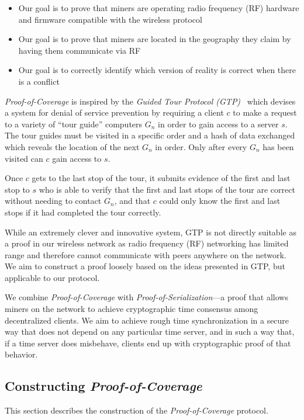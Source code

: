 \documentclass[UTF8, 10pt, nonatbib, nocopyrightspace, reprint]{sigplanconf}
\begin{document}
\begin{itemize}
    \item Our goal is to prove that miners are operating radio frequency (RF) hardware and firmware compatible with the wireless protocol
    \item Our goal is to prove that miners are located in the geography they claim by having them communicate via RF
    \item Our goal is to correctly identify which version of reality is correct when there is a conflict
\end{itemize}

\emph{Proof-of-Coverage} is inspired by the \emph{Guided Tour Protocol (GTP)}~\cite{gtp} which devises a system for denial of service prevention by requiring a client $c$ to make a request to a variety of ``tour guide'' computers $G_n$ in order to gain access to a server $s$. The tour guides must be visited in a specific order and a hash of data exchanged which reveals the location of the next $G_n$ in order. Only after every $G_n$ has been visited can $c$ gain access to $s$.

Once $c$ gets to the last stop of the tour, it submits evidence of the first and last stop to $s$ who is able to verify that the first and last stops of the tour are correct without needing to contact $G_n$, and that $c$ could only know the first and last stops if it had completed the tour correctly.

While an extremely clever and innovative system, GTP is not directly suitable as a proof in our wireless network as radio frequency (RF) networking has limited range and therefore cannot communicate with peers anywhere on the network. We aim to construct a proof loosely based on the ideas presented in GTP, but applicable to our protocol.

We combine \emph{Proof-of-Coverage} with \emph{Proof-of-Serialization}---a proof that allows miners on the network to achieve cryptographic time consensus among decentralized clients. We aim to achieve rough time synchronization in a secure way that does not depend on any particular time server, and in such a way that, if a time server does misbehave, clients end up with cryptographic proof of that behavior.

\subsection{Constructing \emph{Proof-of-Coverage}}

This section describes the construction of the \emph{Proof-of-Coverage} protocol.
\end{document}
